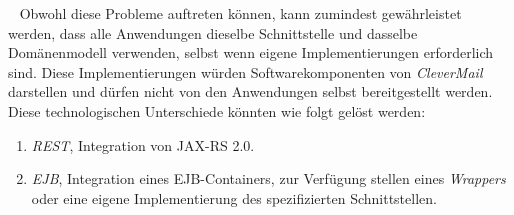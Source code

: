 \ \newline
Obwohl diese Probleme auftreten können, kann zumindest gewährleistet werden, dass alle Anwendungen dieselbe Schnittstelle und dasselbe Domänenmodell verwenden, selbst wenn eigene Implementierungen erforderlich sind. Diese Implementierungen würden Softwarekomponenten von \emph{CleverMail} darstellen und dürfen nicht von den Anwendungen selbst bereitgestellt werden.
Diese technologischen Unterschiede könnten wie folgt gelöst werden:
\begin{enumerate}
	\item\emph{REST}, Integration von JAX-RS 2.0. 
	\item\emph{EJB}, Integration eines EJB-Containers, zur Verfügung stellen eines \emph{Wrappers} oder eine eigene Implementierung des spezifizierten Schnittstellen.
\end{enumerate}

